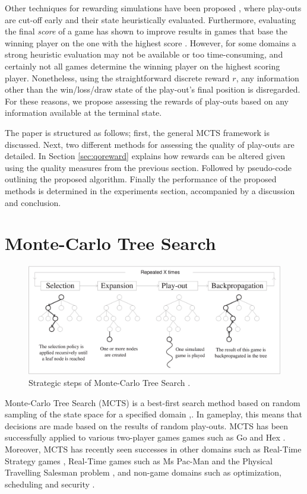 \documentclass{ecai2010}
\begin{document}
Other techniques for rewarding simulations have been proposed \cite{Winands2010a}, where play-outs are cut-off early and their state heuristically evaluated. Furthermore, evaluating the final \emph{score} of a game has shown to improve results in games that base the winning player on the one with the highest score \cite{shibahara2008combining}. However, for some domains a strong heuristic evaluation may not be available or too time-consuming, and certainly not all games determine the winning player on the highest scoring player. Nonetheless, using the straightforward discrete reward $r$, any information other than the win/loss/draw state of the play-out's final position is disregarded. For these reasons, we propose assessing the rewards of play-outs based on any information available at the terminal state.

The paper is structured as follows; first, the general MCTS framework is discussed. Next, two different methods for assessing the quality of play-outs are detailed. In Section \ref{sec:qoreward} explains how rewards can be altered given using the quality measures from the previous section. Followed by pseudo-code outlining the proposed algorithm. Finally the performance of the proposed methods is determined in the experiments section, accompanied by a discussion and conclusion.

\section{Monte-Carlo Tree Search}
\label{sec:mcts}
\begin{figure}[ht]
	\centering
	\includegraphics[width=.45\textwidth]{img/figure1.eps}
	\caption{Strategic steps of Monte-Carlo Tree Search \cite{chaslot2008progressive}.}
	\label{fig:mcts-algorithm}
\end{figure}
Monte-Carlo Tree Search (MCTS) is a best-first search method based on random sampling of the state space for a specified domain \cite{kocsis2006bandit},\cite{coulom2007efficient}. In gameplay, this means that decisions are made based on the results of random play-outs. MCTS has been successfully applied to various two-player games games such as Go \cite{lee2010current} and Hex \cite{arneson2010monte}. Moreover, MCTS has recently seen successes in other domains such as Real-Time Strategy games \cite{browne2012survey}, Real-Time games such as Ms Pac-Man \cite{enhancementspacmancig12} and the Physical Travelling Salesman problem \cite{powleytsp}, and non-game domains such as optimization, scheduling and security \cite{browne2012survey}.
\end{document}
